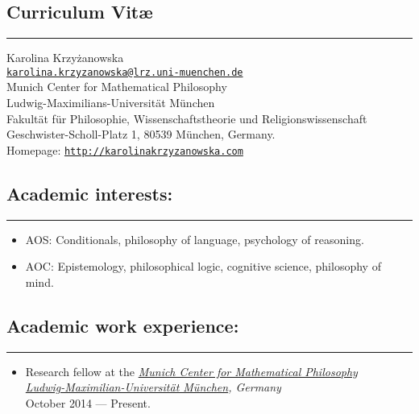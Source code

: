 \documentclass[a4paper,12pt]{article}
\begin{document}
\newcommand{\headone}[1] {
 \section*{#1}
\rule[2.5ex]{\textwidth}{2pt}}

\newcommand{\headtwo}[1]{
  \subsection*{#1}
  \rule[1.5ex]{\textwidth}{.5pt}}

\newcommand{\headthree}[1]{ {\large #1}}

\newcommand{\link}[1]{ \texttt{\href{#1}{#1}}}

\begin{small}

  \headone{Curriculum Vit\ae}
  
  Karolina Krzyżanowska\\
  \href{mailto:karolina.krzyzanowska@lrz.uni-muenchen.de}{\texttt{karolina.krzyzanowska@lrz.uni-muenchen.de}}\\
  Munich Center for Mathematical Philosophy\\
  Ludwig-Maximilians-Universität München\\
Fakultät für Philosophie, Wissenschaftstheorie und Religionswissenschaft\\
Geschwister-Scholl-Platz 1, 80539 München, Germany.\\
  Homepage: \href{http://karolinakrzyzanowska.com}{\texttt{http://karolinakrzyzanowska.com}}\\

  
  \headtwo{Academic interests:}
  \begin{itemize}
  \item AOS: Conditionals, philosophy of language, psychology of reasoning.
  \item AOC: Epistemology, philosophical logic, cognitive science,
    philosophy of mind.
  \end{itemize}
  
  \headtwo{Academic work experience:}
  \begin{itemize}
\item Research fellow at the \emph{\href{http://www.mcmp.philosophie.uni-muenchen.de/}{Munich Center for Mathematical Philosophy}}\\
\emph{\href{http://www.en.uni-muenchen.de/}{Ludwig-Maximilian-Universität München}, Germany}\\
October 2014 --- Present.


\end{itemize}
\end{small}
\end{document}
